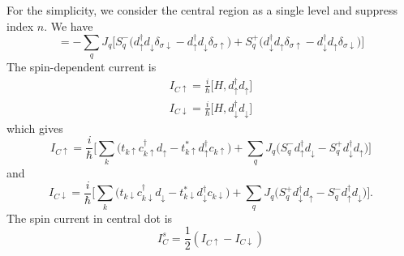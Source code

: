 \documentclass[aps,prb,superscriptaddress]{revtex4-2}
\begin{document}
For the simplicity, we consider the central region as a single level and suppress index $n$. We have
\begin{equation}
[H_{\rm sd},  d_{\sigma}^{\dag}d_{\sigma}] =  -\sum_{q}J_{q}\big[ S_{q}^{-} \big( d_{\uparrow}^{\dag}d_{\downarrow}\delta_{\sigma \downarrow} - d_{\uparrow}^{\dag}d_{\downarrow}\delta_{\sigma \uparrow} \big) + S_{q}^{+}\big(d_{\downarrow}^{\dag}d_{\uparrow}\delta_{\sigma \uparrow} - d_{\downarrow}^{\dag}d_{\uparrow}\delta_{\sigma \downarrow} \big)\big]
\end{equation}
The spin-dependent current is
\begin{eqnarray}
I_{C\uparrow} = \frac{i}{\hbar}\big[ H, d_{\uparrow}^{\dag} d_{\uparrow} \big]
\\
I_{C\downarrow} = \frac{i}{\hbar}\big[ H, d_{\downarrow}^{\dag} d_{\downarrow} \big]
\end{eqnarray}
which gives
\begin{equation}
I_{C\uparrow} = \frac{i}{\hbar} \big[ \sum_{k}\big(t_{k\uparrow} c_{k\uparrow}^{\dag}d_{\uparrow} - t_{k\uparrow}^{*} d_{\uparrow}^{\dag}c_{k\uparrow} \big) + \sum_{q}J_{q}\big( S_{q}^{-} d_{\uparrow}^{\dag}d_{\downarrow} - S_{q}^{+}d_{\downarrow}^{\dag}d_{\uparrow} \big)\big]
\end{equation}
and
\begin{equation}
I_{C\downarrow} = \frac{i}{\hbar} \big[ \sum_{k}\big(t_{k\downarrow} c_{k\downarrow}^{\dag}d_{\downarrow} - t_{k\downarrow}^{*} d_{\downarrow}^{\dag}c_{k\downarrow} \big) + \sum_{q}J_{q}\big(S_{q}^{+}d_{\downarrow}^{\dag}d_{\uparrow} -  S_{q}^{-} d_{\uparrow}^{\dag}d_{\downarrow} \big)\big].
\end{equation}
The spin current in central dot is
\begin{equation}
I_C^s = \frac{1}{2}(I_{C\uparrow} - I_{C\downarrow})
\end{equation}
\end{document}

